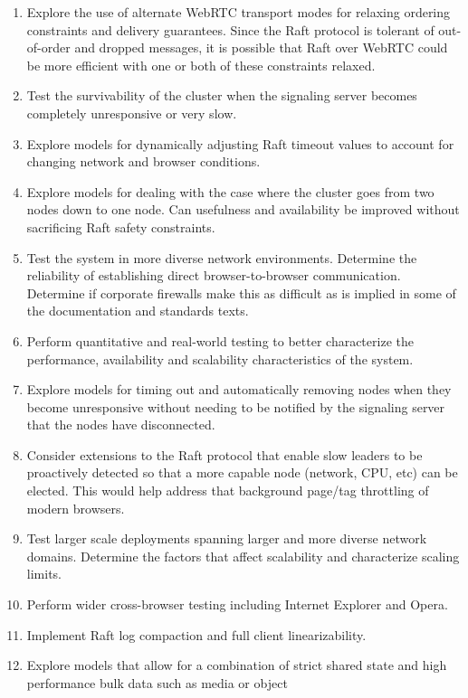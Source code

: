\documentclass[9pt]{extarticle}
\begin{document}
\begin{multicols}{2}
\begin{enumerate}
\item Explore the use of alternate WebRTC transport modes for relaxing
    ordering constraints and delivery guarantees. Since the Raft
    protocol is tolerant of out-of-order and dropped messages, it is
    possible that Raft over WebRTC could be more efficient with one or
    both of these constraints relaxed.
\item Test the survivability of the cluster when the signaling server
    becomes completely unresponsive or very slow.
\item Explore models for dynamically adjusting Raft timeout values to
    account for changing network and browser conditions.
\item Explore models for dealing with the case where the cluster goes
    from two nodes down to one node. Can usefulness and availability
    be improved without sacrificing Raft safety constraints.
\item Test the system in more diverse network environments. Determine
    the reliability of establishing direct browser-to-browser
    communication.  Determine if corporate firewalls make this as
    difficult as is implied in some of the documentation and standards
    texts. %
\item Perform quantitative and real-world testing to better
    characterize the performance, availability and scalability
    characteristics of the system.
\item Explore models for timing out and automatically removing nodes
    when they become unresponsive without needing to be notified by
    the signaling server that the nodes have disconnected.
\item Consider extensions to the Raft protocol that enable slow
    leaders to be proactively detected so that a more capable node
    (network, CPU, etc) can be elected. This would help address that
    background page/tag throttling of modern browsers.
\item Test larger scale deployments spanning larger and more diverse
    network domains. Determine the factors that affect scalability and
    characterize scaling limits.
\item Perform wider cross-browser testing including Internet Explorer
    and Opera.
\item Implement Raft log compaction and full client linearizability.
\item Explore models that allow for a combination of strict shared
    state and high performance bulk data such as media or object

\end{enumerate}
\end{multicols}
\end{document}
